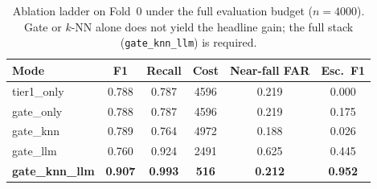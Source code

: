 \begin{table}[!t]
\centering
\caption{Ablation ladder on Fold~0 under the full evaluation budget ($n{=}4000$). Gate or $k$-NN alone does not yield the headline gain; the full stack (\texttt{gate\_knn\_llm}) is required.}
\label{tab:ablation}
\begin{tabular}{lccccc}
\toprule
Mode & F1 & Recall & Cost & Near-fall FAR & Esc.\ F1 \\
\midrule
tier1\_only & 0.788 & 0.787 & 4596 & 0.219 & 0.000 \\
gate\_only & 0.788 & 0.787 & 4596 & 0.219 & 0.175 \\
gate\_knn & 0.789 & 0.764 & 4972 & 0.188 & 0.026 \\
gate\_llm & 0.760 & 0.924 & 2491 & 0.625 & 0.445 \\
\textbf{gate\_knn\_llm} & \textbf{0.907} & \textbf{0.993} & \textbf{516} & \textbf{0.212} & \textbf{0.952} \\
\bottomrule
\end{tabular}
\end{table}
